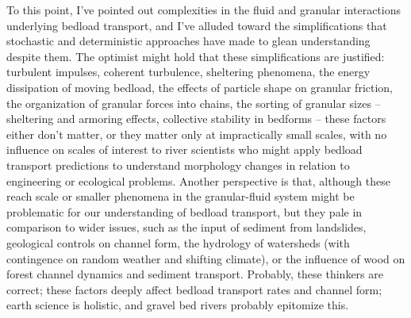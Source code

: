 \documentclass{article}
\begin{document}
{To this point, I've pointed out complexities in the fluid and granular interactions underlying bedload transport, and I've alluded toward the simplifications that stochastic and deterministic approaches have made to glean understanding despite them. 
The optimist might hold that these simplifications are justified: turbulent impulses, coherent turbulence, sheltering phenomena, the energy dissipation of moving bedload, the effects of particle shape on granular friction, the organization of granular forces into chains, the sorting of granular sizes -- sheltering and armoring effects, collective stability in bedforms -- these factors either don't matter, or they matter only at impractically small scales, with no influence on scales of interest to river scientists who might apply bedload transport predictions to understand morphology changes in relation to engineering or ecological problems.
Another perspective is that, although these reach scale or smaller phenomena in the granular-fluid system might be problematic for our understanding of bedload transport, but they pale in comparison to wider issues, such as the input of sediment from landslides, geological controls on channel form, the hydrology of watersheds (with contingence on random weather and shifting climate), or the influence of wood on forest channel dynamics and sediment transport. 
Probably, these thinkers are correct; these factors deeply affect bedload transport rates and channel form; earth science is holistic, and gravel bed rivers probably epitomize this.

}
\end{document}
